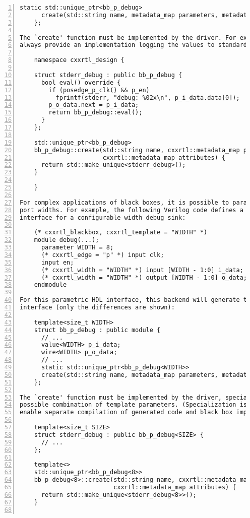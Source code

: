 \begin{lstlisting}[numbers=left,frame=single]
      static std::unique_ptr<bb_p_debug>
      create(std::string name, metadata_map parameters, metadata_map attributes);
    };

The `create' function must be implemented by the driver. For example, it could
always provide an implementation logging the values to standard error stream:

    namespace cxxrtl_design {

    struct stderr_debug : public bb_p_debug {
      bool eval() override {
        if (posedge_p_clk() && p_en)
          fprintf(stderr, "debug: %02x\n", p_i_data.data[0]);
        p_o_data.next = p_i_data;
        return bb_p_debug::eval();
      }
    };

    std::unique_ptr<bb_p_debug>
    bb_p_debug::create(std::string name, cxxrtl::metadata_map parameters,
                       cxxrtl::metadata_map attributes) {
      return std::make_unique<stderr_debug>();
    }

    }

For complex applications of black boxes, it is possible to parameterize their
port widths. For example, the following Verilog code defines a CXXRTL black box
interface for a configurable width debug sink:

    (* cxxrtl_blackbox, cxxrtl_template = "WIDTH" *)
    module debug(...);
      parameter WIDTH = 8;
      (* cxxrtl_edge = "p" *) input clk;
      input en;
      (* cxxrtl_width = "WIDTH" *) input [WIDTH - 1:0] i_data;
      (* cxxrtl_width = "WIDTH" *) output [WIDTH - 1:0] o_data;
    endmodule

For this parametric HDL interface, this backend will generate the following C++
interface (only the differences are shown):

    template<size_t WIDTH>
    struct bb_p_debug : public module {
      // ...
      value<WIDTH> p_i_data;
      wire<WIDTH> p_o_data;
      // ...
      static std::unique_ptr<bb_p_debug<WIDTH>>
      create(std::string name, metadata_map parameters, metadata_map attributes);
    };

The `create' function must be implemented by the driver, specialized for every
possible combination of template parameters. (Specialization is necessary to
enable separate compilation of generated code and black box implementations.)

    template<size_t SIZE>
    struct stderr_debug : public bb_p_debug<SIZE> {
      // ...
    };

    template<>
    std::unique_ptr<bb_p_debug<8>>
    bb_p_debug<8>::create(std::string name, cxxrtl::metadata_map parameters,
                          cxxrtl::metadata_map attributes) {
      return std::make_unique<stderr_debug<8>>();
    }


\end{lstlisting}
